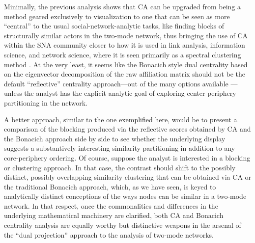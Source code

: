 \documentclass[a4paper,fleqn]{cas-sc}
\begin{document}
Minimally, the previous analysis shows that CA can be upgraded from being a method geared exclusively to visualization to one that can be seen as more ``central'' to the usual social-network-analytic tasks, like finding blocks of structurally similar actors in the two-mode network, thus bringing the use of CA within the SNA community closer to how it is used in link analysis, information science, and network science, where it is seen primarily as a spectral clustering method \citep{van2021correspondence, yen2010link, mealy2019interpreting}. At the very least, it seems like the Bonacich style dual centrality based on the eigenvector decomposition of the raw affiliation matrix should not be the default ``reflective'' centrality approach---out of the many options available \citep{yang2022comparing}---unless the analyst has the explicit analytic goal of exploring center-periphery partitioning in the network. 

A better approach, similar to the one exemplified here, would be to present a comparison of the blocking produced via the reflective scores obtained by CA and the Bonacich approach side by side to see whether the underlying display suggests a substantively interesting similarity partitioning in addition to any core-periphery ordering. Of course, suppose the analyst is interested in a blocking or clustering approach. In that case, the contrast should shift to the possibly distinct, possibly overlapping similarity clustering that can be obtained via CA or the traditional Bonacich approach, which, as we have seen, is keyed to analytically distinct conceptions of the ways nodes can be similar in a two-mode network. In that respect, once the commonalities and differences in the underlying mathematical machinery are clarified, both CA and Bonacich centrality analysis are equally worthy but distinctive weapons in the arsenal of the ``dual projection'' \citep{everett2013dual} approach to the analysis of two-mode networks.



%


\end{document}
